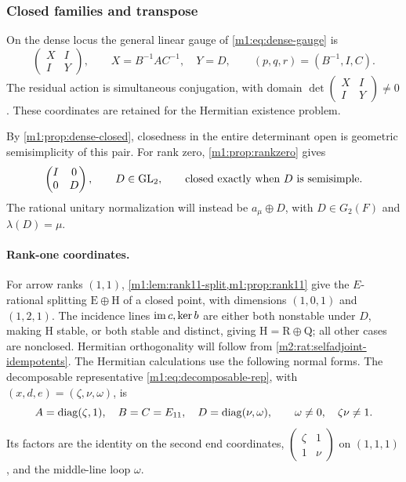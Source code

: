 \subsubsection{Closed families and transpose}

On the dense locus the general linear gauge of \eqref{m1:eq:dense-gauge} is
\begin{equation}\label{m2:geo:dense-gauge}
 \begin{pmatrix}X&I\\I&Y\end{pmatrix},\qquad
 X=B^{-1}AC^{-1},\quad Y=D,
 \qquad(p,q,r)=(B^{-1},I,C).
\end{equation}
The residual action is simultaneous conjugation, with domain
$\det\left(\begin{smallmatrix}X&I\\I&Y\end{smallmatrix}\right)\ne0$.
These coordinates are retained for the Hermitian existence problem.

By \cref{m1:prop:dense-closed}, closedness in the entire determinant
open is geometric semisimplicity of this pair. For rank zero,
\cref{m1:prop:rankzero} gives
\begin{equation}\label{m2:geo:rankzero}
 \begin{pmatrix}I&0\\0&D\end{pmatrix},\qquad
 D\in\operatorname{GL}_2,\qquad\text{closed exactly when $D$ is semisimple.}
\end{equation}
The rational unitary normalization will instead be
$a_\mu\oplus D$, with $D\in G_2(F)$ and $\lambda(D)=\mu$.

\paragraph{Rank-one coordinates.}

For arrow ranks $(1,1)$, \cref{m1:lem:rank11-split,m1:prop:rank11}
give the $E$-rational splitting $\mathrm E\oplus\mathrm H$ of a
closed point, with dimensions $(1,0,1)$ and $(1,2,1)$.
The incidence lines $\operatorname{im} c,\ker b$ are either both nonstable under
$D$, making $\mathrm H$ stable, or both stable and distinct,
giving $\mathrm H=\mathrm R\oplus\mathrm Q$; all other cases are
nonclosed. Hermitian orthogonality will follow from
\cref{m2:rat:selfadjoint-idempotents}.
The Hermitian calculations use the following normal forms.
The decomposable representative \eqref{m1:eq:decomposable-rep}, with
$(x,d,e)=(\zeta,\nu,\omega)$, is
\begin{equation}\label{m2:geo:decomposable-form}
 A=\operatorname{diag}(\zeta,1),\quad B=C=E_{11},\quad
 D=\operatorname{diag}(\nu,\omega),\qquad\omega\ne0,\quad\zeta\nu\ne1.
\end{equation}
Its factors are the identity on the second end coordinates,
$\left(\begin{smallmatrix}\zeta&1\\1&\nu\end{smallmatrix}\right)$
on $(1,1,1)$, and the middle-line loop $\omega$.



